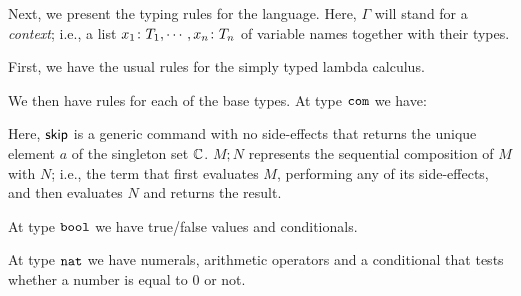 Next, we present the typing rules for the language.  
Here, $\Gamma$ will stand for a \emph{context}; i.e., a list $x_1\colon T_1,\cdots,x_n\colon T_n$ of variable names together with their types.

First, we have the usual rules for the simply typed lambda calculus.


We then have rules for each of the base types.  
At type ${\mathtt{com}}$ we have:
Here, ${\mathsf{skip}}$ is a generic command with no side-effects that returns the unique element $a$ of the singleton set $\mathbb{C}$.  
$M;N$ represents the sequential composition of $M$ with $N$; i.e., the term that first evaluates $M$, performing any of its side-effects, and then evaluates $N$ and returns the result.

At type ${\mathtt{bool}}$ we have true/false values and conditionals.

At type ${\mathtt{nat}}$ we have numerals, arithmetic operators and a conditional that tests whether a number is equal to $0$ or not.

